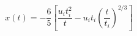 \begin{equation}
\label{comoving}
x(t) = - \frac{6}{5} \left[ \frac{u_i t_i^2}{t} - u_i t_i 
\left(\frac{t}{t_i}\right)^{2/3}\right]
\end{equation}

